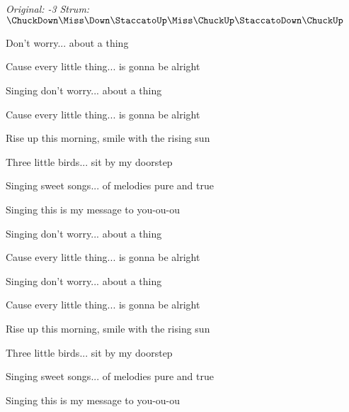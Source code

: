 \begin{song}


\begin{headerbox}
\textit{Original: -3} \quad
\textit{Strum:} $\ChuckDown\Miss\Down\StaccatoUp\Miss\ChuckUp\StaccatoDown\ChuckUp$
\end{headerbox}

\begin{vchordbox}
\end{vchordbox}

\Large

\bigskip

Don't worry... about a thing \par
Cause every little thing... is gonna be alright \par
Singing don't worry... about a thing \par
Cause every little thing... is gonna be alright \par

\bigskip

Rise up this morning, smile with the rising sun \par
Three little birds... sit by my doorstep \par
Singing sweet songs... of melodies pure and true \par
Singing  this is my message to you-ou-ou \par

\bigskip

Singing don't worry... about a thing \par
Cause every little thing... is gonna be alright \par
Singing don't worry... about a thing \par
Cause every little thing... is gonna be alright \par

\bigskip

Rise up this morning, smile with the rising sun \par
Three little birds... sit by my doorstep \par
Singing sweet songs... of melodies pure and true \par
Singing  this is my message to you-ou-ou \par


\end{song}
